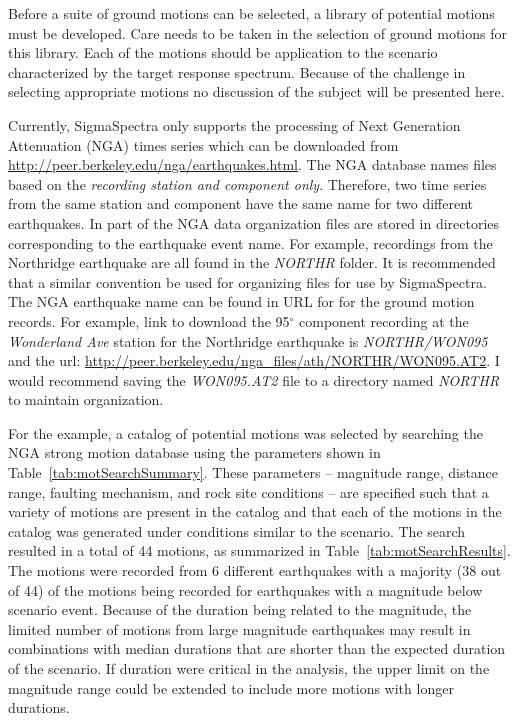 \documentclass[11pt]{article}
\begin{document}
Before a suite of ground motions can be selected, a library of potential motions
must be developed.  Care needs to be taken in the selection of ground motions
for this library. Each of the motions should be application to the scenario
characterized by the target response spectrum. Because of the challenge in
selecting appropriate motions no discussion of the subject will be presented
here.

Currently, SigmaSpectra only supports the processing of Next Generation
Attenuation (NGA) times series which can be downloaded from
\url{http://peer.berkeley.edu/nga/earthquakes.html}. The NGA database names
files based on the \emph{recording station and component only}. Therefore, two
time series from the same station and component have the same name for two
different earthquakes. In part of the NGA data organization files are stored in
directories corresponding to the earthquake event name. For example, recordings
from the Northridge earthquake are all found in the \emph{NORTHR} folder. It is
recommended that a similar convention be used for organizing files for use by
SigmaSpectra. The NGA earthquake name can be found in URL for for the ground
motion records. For example, link to download the 95$^\circ$ component recording
at the \emph{Wonderland Ave} station for the Northridge earthquake is
\emph{NORTHR/WON095} and the url:
\url{http://peer.berkeley.edu/nga\_files/ath/NORTHR/WON095.AT2}. I would
recommend saving the \emph{WON095.AT2} file to a directory named \emph{NORTHR}
to maintain organization.

For the example, a catalog of potential motions was selected by searching the
NGA strong motion database using the parameters shown in
Table~\ref{tab:motSearchSummary}. These parameters -- magnitude range, distance
range, faulting mechanism, and rock site conditions -- are specified such that a
variety of motions are present in the catalog and that each of the motions in
the catalog was generated under conditions similar to the scenario. The search
resulted in a total of 44 motions, as summarized in
Table~\ref{tab:motSearchResults}. The motions were recorded from 6 different
earthquakes with a majority (38 out of 44) of the motions being recorded for
earthquakes with a magnitude below scenario event. Because of the duration being
related to the magnitude, the limited number of motions from large magnitude
earthquakes may result in combinations with median durations that are shorter
than the expected duration of the scenario. If duration were critical in the
analysis, the upper limit on the magnitude range could be extended to include
more motions with longer durations.   
\end{document}
